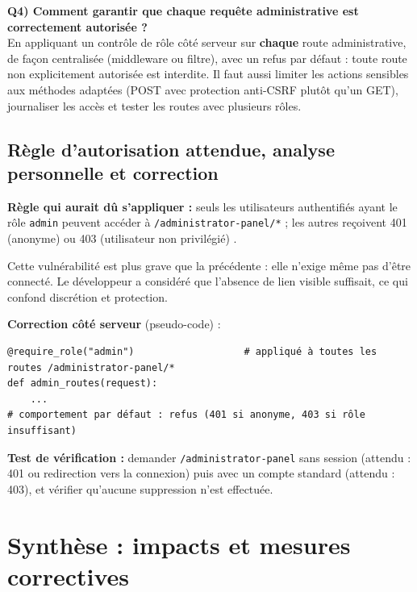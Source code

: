 \documentclass{rapportENSIAS}
\begin{document}
\textbf{Q4) Comment garantir que chaque requête administrative est correctement autorisée ?}\\
En appliquant un contrôle de rôle côté serveur sur \textbf{chaque} route administrative, de façon centralisée (middleware ou filtre), avec un refus par défaut : toute route non explicitement autorisée est interdite. Il faut aussi limiter les actions sensibles aux méthodes adaptées (POST avec protection anti-CSRF plutôt qu'un GET), journaliser les accès et tester les routes avec plusieurs rôles.

\subsection{Règle d'autorisation attendue, analyse personnelle et correction}

\textbf{Règle qui aurait dû s'appliquer :} \og seuls les utilisateurs authentifiés ayant le rôle \texttt{admin} peuvent accéder à \texttt{/administrator-panel/*} ; les autres reçoivent 401 (anonyme) ou 403 (utilisateur non privilégié) \fg.

Cette vulnérabilité est plus grave que la précédente : elle n'exige même pas d'être connecté. Le développeur a considéré que l'absence de lien visible suffisait, ce qui confond discrétion et protection.

\textbf{Correction côté serveur} (pseudo-code) :
\begin{verbatim}
@require_role("admin")                   # appliqué à toutes les routes /administrator-panel/*
def admin_routes(request):
    ...
# comportement par défaut : refus (401 si anonyme, 403 si rôle insuffisant)
\end{verbatim}

\textbf{Test de vérification :} demander \texttt{/administrator-panel} sans session (attendu : 401 ou redirection vers la connexion) puis avec un compte standard (attendu : 403), et vérifier qu'aucune suppression n'est effectuée.

\section{Synthèse : impacts et mesures correctives}
\end{document}
